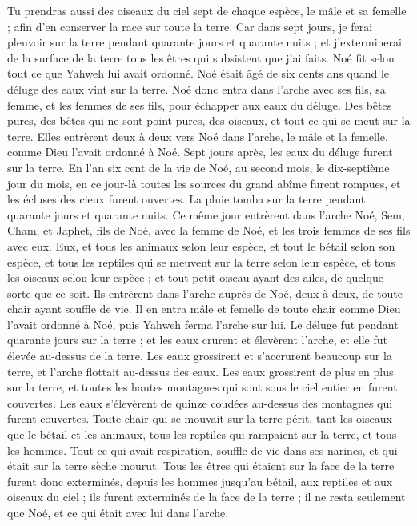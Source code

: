 \begin{multicols}{2}
Tu prendras aussi des oiseaux du ciel sept de chaque espèce, le mâle et sa femelle ; afin d'en conserver la race sur toute la terre.
Car dans sept jours, je ferai pleuvoir sur la terre pendant quarante jours et quarante nuits ; et j'exterminerai de la surface de la terre tous les êtres qui subsistent que j'ai faits.
Noé fit selon tout ce que Yahweh lui avait ordonné.
Noé était âgé de six cents ans quand le déluge des eaux vint sur la terre.
Noé donc entra dans l’arche avec ses fils, sa femme, et les femmes de ses fils, pour échapper aux eaux du déluge.
Des bêtes pures, des bêtes qui ne sont point pures, des oiseaux, et tout ce qui se meut sur la terre.
Elles entrèrent deux à deux vers Noé dans l'arche, le mâle et la femelle, comme Dieu l’avait ordonné à Noé.
Sept jours après, les eaux du déluge furent sur la terre.
En l'an six cent de la vie de Noé, au second mois, le dix-septième jour du mois, en ce jour-là toutes les sources du grand abîme furent rompues, et les écluses des cieux furent ouvertes.
La pluie tomba sur la terre pendant quarante jours et quarante nuits.
Ce même jour entrèrent dans l’arche Noé, Sem, Cham, et Japhet, fils de Noé, avec la femme de Noé, et les trois femmes de ses fils avec eux.
Eux, et tous les animaux selon leur espèce, et tout le bétail selon son espèce, et tous les reptiles qui se meuvent sur la terre selon leur espèce, et tous les oiseaux selon leur espèce ; et tout petit oiseau ayant des ailes, de quelque sorte que ce soit.
Ils entrèrent dans l'arche auprès de Noé, deux à deux, de toute chair ayant souffle de vie.
Il en entra mâle et femelle de toute chair comme Dieu l’avait ordonné à Noé, puis Yahweh ferma l'arche sur lui.
Le déluge fut pendant quarante jours sur la terre ; et les eaux crurent et élevèrent l'arche, et elle fut élevée au-dessus de la terre.
Les eaux  grossirent et s'accrurent beaucoup sur la terre, et l'arche flottait au-dessus des eaux.
Les eaux grossirent de plus en plus sur la terre, et toutes les hautes montagnes qui sont sous le ciel entier en furent couvertes.
Les eaux s’élevèrent de quinze coudées au-dessus des montagnes  qui furent couvertes.
Toute chair qui se mouvait sur la terre périt, tant les oiseaux que le bétail et les animaux, tous les reptiles qui rampaient sur la terre, et tous les hommes.
Tout ce qui avait respiration, souffle de vie dans ses narines, et qui était sur la terre sèche mourut.
Tous les êtres qui étaient sur la face de la terre furent donc exterminés, depuis les hommes jusqu’au bétail, aux reptiles et aux oiseaux du ciel ; ils furent exterminés de la face de la terre ; il ne resta seulement que Noé, et ce qui était avec lui dans l'arche.

\end{multicols}
